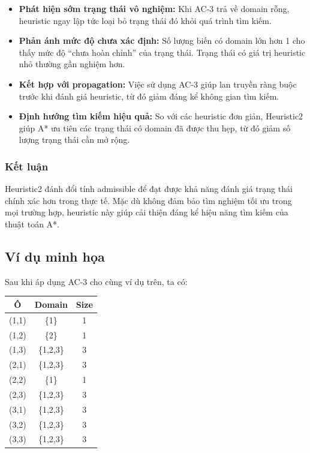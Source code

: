 \begin{itemize}
    \item \textbf{Phát hiện sớm trạng thái vô nghiệm:}  
    Khi AC-3 trả về domain rỗng, heuristic ngay lập tức loại bỏ trạng thái đó khỏi quá trình tìm kiếm.

    \item \textbf{Phản ánh mức độ chưa xác định:}  
    Số lượng biến có domain lớn hơn 1 cho thấy mức độ “chưa hoàn chỉnh” của trạng thái. Trạng thái có giá trị heuristic nhỏ thường gần nghiệm hơn.

    \item \textbf{Kết hợp với propagation:}  
    Việc sử dụng AC-3 giúp lan truyền ràng buộc trước khi đánh giá heuristic, từ đó giảm đáng kể không gian tìm kiếm.

    \item \textbf{Định hướng tìm kiếm hiệu quả:}  
    So với các heuristic đơn giản, Heuristic2 giúp A* ưu tiên các trạng thái có domain đã được thu hẹp, từ đó giảm số lượng trạng thái cần mở rộng.
\end{itemize}

\subsubsection{Kết luận}

Heuristic2 đánh đổi tính admissible để đạt được khả năng đánh giá trạng thái chính xác hơn trong thực tế. Mặc dù không đảm bảo tìm nghiệm tối ưu trong mọi trường hợp, heuristic này giúp cải thiện đáng kể hiệu năng tìm kiếm của thuật toán A*.
\subsection{Ví dụ minh họa}

Sau khi áp dụng AC-3 cho cùng ví dụ trên, ta có:

\begin{center}
\begin{tabular}{|c|c|c|}
\hline
Ô & Domain & Size \\
\hline
(1,1) & \{1\} & 1 \\
(1,2) & \{2\} & 1 \\
(1,3) & \{1,2,3\} & 3 \\
(2,1) & \{1,2,3\} & 3 \\
(2,2) & \{1\} & 1 \\
(2,3) & \{1,2,3\} & 3 \\
(3,1) & \{1,2,3\} & 3 \\
(3,2) & \{1,2,3\} & 3 \\
(3,3) & \{1,2,3\} & 3 \\
\hline
\end{tabular}
\end{center}

